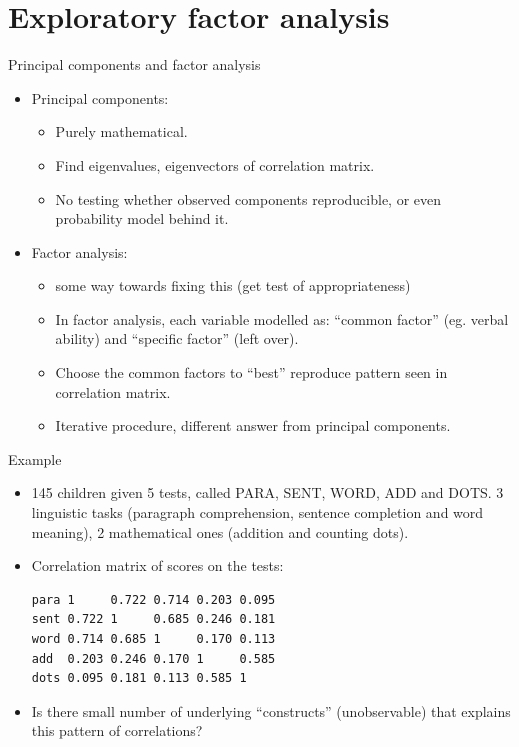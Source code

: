 \section{Exploratory factor analysis}
\frame{\sectionpage}


\begin{frame}[fragile]{Principal components and factor analysis}

  \begin{itemize}
  \item Principal components: 
    \begin{itemize}
    \item Purely mathematical.
    \item Find eigenvalues, eigenvectors of correlation matrix.
    \item No testing whether observed components reproducible, or even probability model behind it.
    \end{itemize}
  \item Factor analysis: 
    \begin{itemize}
    \item some way towards fixing this (get test of appropriateness)
    \item In factor analysis, each variable modelled as: ``common factor'' (eg. verbal ability) and ``specific factor'' (left over).
    \item Choose the common factors to ``best'' reproduce pattern seen in correlation matrix.
    \item Iterative procedure, different answer from principal components.
    \end{itemize}

  \end{itemize}

\end{frame}

\begin{frame}[fragile]{Example}

  \begin{itemize}
  \item 
145 children given 5 tests, called PARA, SENT, WORD, ADD and DOTS. 3 linguistic tasks (paragraph comprehension, sentence completion  and word meaning), 2 mathematical ones (addition and counting dots).
\item Correlation matrix of scores on the tests:

\begin{verbatim}
para 1     0.722 0.714 0.203 0.095
sent 0.722 1     0.685 0.246 0.181
word 0.714 0.685 1     0.170 0.113
add  0.203 0.246 0.170 1     0.585
dots 0.095 0.181 0.113 0.585 1
\end{verbatim}

\item Is there small number of underlying ``constructs'' (unobservable) that explains this pattern of correlations?


  \end{itemize}
  
\end{frame}

